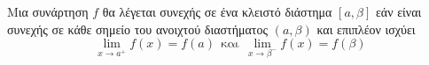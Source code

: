 Μια συνάρτηση $ f $ θα λέγεται συνεχής σε ένα κλειστό διάστημα $ [a,\beta] $ εάν είναι συνεχής σε κάθε σημείο του ανοιχτού διαστήματος $ (a,\beta) $ και επιπλέον ισχύει
\[ \lim_{x\to a^+}{f(x)}=f(a)\ \ \textrm{και}\ \ \lim_{x\to\beta^-}{f(x)}=f(\beta) \]
